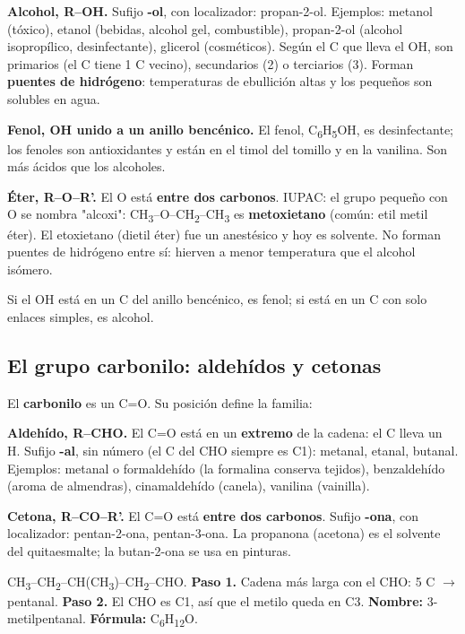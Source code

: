 \textbf{Alcohol, R--OH.} Sufijo \textbf{-ol}, con localizador: propan-2-ol. Ejemplos: metanol (tóxico), etanol (bebidas, alcohol gel, combustible), propan-2-ol (alcohol isopropílico, desinfectante), glicerol (cosméticos). Según el C que lleva el OH, son primarios (el C tiene 1 C vecino), secundarios (2) o terciarios (3). Forman \textbf{puentes de hidrógeno}: temperaturas de ebullición altas y los pequeños son solubles en agua.

 

\textbf{Fenol, OH unido a un anillo bencénico.} El fenol, C\textsubscript{6}H\textsubscript{5}OH, es desinfectante; los fenoles son antioxidantes y están en el timol del tomillo y en la vanilina. Son más ácidos que los alcoholes.

  

\textbf{Éter, R--O--R'.} El O está \textbf{entre dos carbonos}. IUPAC: el grupo pequeño con O se nombra "alcoxi": CH\textsubscript{3}--O--CH\textsubscript{2}--CH\textsubscript{3} es \textbf{metoxietano} (común: etil metil éter). El etoxietano (dietil éter) fue un anestésico y hoy es solvente. No forman puentes de hidrógeno entre sí: hierven a menor temperatura que el alcohol isómero.

 
\begin{ojo} Si el OH está en un C del anillo bencénico, es fenol; si está en un C con solo enlaces simples, es alcohol.\end{ojo}
\subsection{El grupo carbonilo: aldehídos y cetonas}
El \textbf{carbonilo} es un C=O. Su posición define la familia:

 

\textbf{Aldehído, R--CHO.} El C=O está en un \textbf{extremo} de la cadena: el C lleva un H. Sufijo \textbf{-al}, sin número (el C del CHO siempre es C1): metanal, etanal, butanal. Ejemplos: metanal o formaldehído (la formalina conserva tejidos), benzaldehído (aroma de almendras), cinamaldehído (canela), vanilina (vainilla).

 

\textbf{Cetona, R--CO--R'.} El C=O está \textbf{entre dos carbonos}. Sufijo \textbf{-ona}, con localizador: pentan-2-ona, pentan-3-ona. La propanona (acetona) es el solvente del quitaesmalte; la butan-2-ona se usa en pinturas.

  
\begin{ejemplo} CH\textsubscript{3}--CH\textsubscript{2}--CH(CH\textsubscript{3})--CH\textsubscript{2}--CHO. \textbf{Paso 1.} Cadena más larga con el CHO: 5 C \ensuremath{\rightarrow} pentanal. \textbf{Paso 2.} El CHO es C1, así que el metilo queda en C3. \textbf{Nombre:} 3-metilpentanal. \textbf{Fórmula:} C\textsubscript{6}H\textsubscript{12}O.\end{ejemplo}
 
